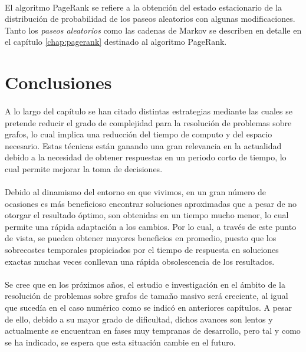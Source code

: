 \documentclass{subfiles}
\begin{document}
        \paragraph{}
        El algoritmo PageRank se refiere a la obtención del estado estacionario de la distribución de probabilidad de los paseos aleatorios con algunas modificaciones. Tanto los \emph{paseos aleatorios} como las cadenas de Markov se describen en detalle en el capítulo \ref{chap:pagerank} destinado al algoritmo PageRank.

    \section{Conclusiones}
    \label{sec:graph_conclusions}

      \paragraph{}
      A lo largo del capítulo se han citado distintas estrategias mediante las cuales se pretende reducir el grado de complejidad para la resolución de problemas sobre grafos, lo cual implica una reducción del tiempo de computo y del espacio necesario. Estas técnicas están ganando una gran relevancia en la actualidad debido a la necesidad de obtener respuestas en un periodo corto de tiempo, lo cual permite mejorar la toma de decisiones.

      \paragraph{}
      Debido al dinamismo del entorno en que vivimos, en un gran número de ocasiones es más beneficioso encontrar soluciones aproximadas que a pesar de no otorgar el resultado óptimo, son obtenidas en un tiempo mucho menor, lo cual permite una rápida adaptación a los cambios. Por lo cual, a través de este punto de vista, se pueden obtener mayores beneficios en promedio, puesto que los sobrecostes temporales propiciados por el tiempo de respuesta en soluciones exactas muchas veces conllevan una rápida obsolescencia de los resultados.

      \paragraph{}
      Se cree que en los próximos años, el estudio e investigación en el ámbito de la resolución de problemas sobre grafos de tamaño masivo será creciente, al igual que sucedía en el caso numérico como se indicó en anteriores capítulos. A pesar de ello, debido a su mayor grado de dificultad, dichos avances son lentos y actualmente se encuentran en fases muy tempranas de desarrollo, pero tal y como se ha indicado, se espera que esta situación cambie en el futuro.
\end{document}
